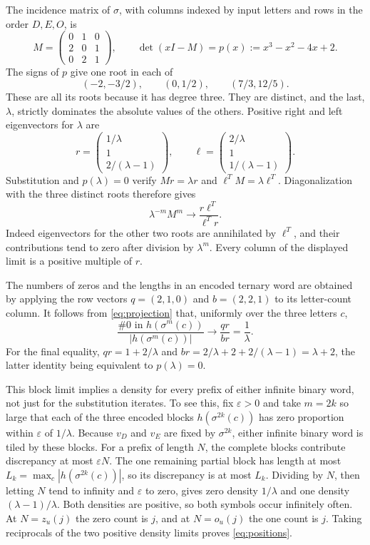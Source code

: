 \documentclass[11pt]{article}
\begin{document}
The incidence matrix of $\sigma$, with columns indexed by input letters
and rows in the order $D,E,O$, is
\[
M=\begin{pmatrix}0&1&0\\2&0&1\\0&2&1\end{pmatrix},\qquad
\det(xI-M)=p(x):=x^3-x^2-4x+2.
\]
The signs of $p$ give one root in each of
\[
(-2,-3/2),\qquad (0,1/2),\qquad (7/3,12/5).
\]
These are all its roots because it has degree three. They are distinct,
and the last, $\lambda$, strictly dominates the absolute values of the others.
Positive right and left eigenvectors for $\lambda$ are
\[
r=\begin{pmatrix}1/\lambda\\1\\2/(\lambda-1)\end{pmatrix},
\qquad
\ell=\begin{pmatrix}2/\lambda\\1\\1/(\lambda-1)\end{pmatrix}.
\]
Substitution and $p(\lambda)=0$ verify $Mr=\lambda r$ and
$\ell^{T}M=\lambda\ell^{T}$. Diagonalization with the three distinct
roots therefore gives
\begin{equation}\label{eq:projection}
\lambda^{-m}M^m\longrightarrow\frac{r\ell^{T}}{\ell^{T}r}.
\end{equation}
Indeed eigenvectors for the other two roots are annihilated by
$\ell^{T}$, and their contributions tend to zero after division by
$\lambda^m$. Every column of the displayed limit is a positive multiple of $r$.

The numbers of zeros and the lengths in an encoded ternary word are
obtained by applying the row vectors $q=(2,1,0)$ and $b=(2,2,1)$ to
its letter-count column. It follows from \eqref{eq:projection} that,
uniformly over the three letters $c$,
\[
\frac{\#0\text{ in }h(\sigma^m(c))}{|h(\sigma^m(c))|}
\longrightarrow \frac{qr}{br}=\frac1\lambda.
\]
For the final equality, $qr=1+2/\lambda$ and
$br=2/\lambda+2+2/(\lambda-1)=\lambda+2$,
the latter identity being equivalent to $p(\lambda)=0$.

This block limit implies a density for every prefix of either infinite
binary word, not just for the substitution iterates. To see this, fix
$\varepsilon>0$ and take $m=2k$ so large that each of the three
encoded blocks $h(\sigma^{2k}(c))$ has zero proportion within
$\varepsilon$ of $1/\lambda$. Because $v_D$ and $v_E$ are fixed
by $\sigma^{2k}$, either infinite binary word is tiled by these blocks.
For a prefix of length $N$, the complete blocks contribute discrepancy
at most $\varepsilon N$. The one remaining partial block has length
at most $L_k=\max_c|h(\sigma^{2k}(c))|$, so its discrepancy is
at most $L_k$. Dividing by $N$, then letting $N$ tend to infinity
and $\varepsilon$ to zero, gives zero density $1/\lambda$ and
one density $(\lambda-1)/\lambda$.
Both densities are positive, so both symbols occur infinitely often.
At $N=z_u(j)$ the zero count is $j$, and at $N=o_u(j)$ the one count
is $j$. Taking reciprocals of the two positive density limits proves
\eqref{eq:positions}.
\end{document}
